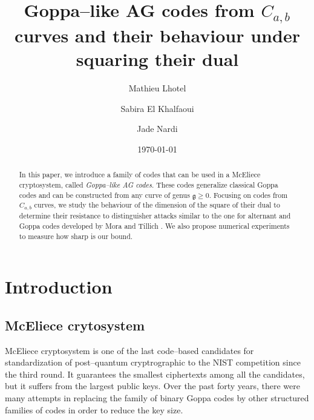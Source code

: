 \documentclass[a4paper]{amsart}
\title{Goppa--like AG codes from $C_{a,b}$ curves and their behaviour under squaring their dual}
\author{Mathieu Lhotel}
\author{Sabira El Khalfaoui}
\author{Jade Nardi}
\date{\today}
\theoremstyle{definition}
\theoremstyle{remark}
\begin{document}
\maketitle

\begin{abstract}
In this paper, we introduce a family of codes that can be used in a McEliece cryptosystem, called \emph{Goppa--like AG codes}. These codes generalize classical Goppa codes and can be constructed from any curve of genus $\mathfrak{g} \geq 0$. Focusing on codes from $C_{a,b}$ curves, we study the behaviour of the dimension of the square of their dual to determine their resistance to distinguisher attacks similar to the one for alternant and Goppa codes developed by Mora and Tillich \cite{MT21}. We also propose numerical experiments to measure how sharp is our bound.
\end{abstract}
 

\section*{Introduction}

\subsection*{McEliece crytosystem}
McEliece cryptosystem is one of the last code--based candidates for standardization of post--quantum cryptrographic to the NIST competition since the third round. It guarantees the smallest ciphertexts among all the candidates, but it suffers from the largest public keys. Over the past forty years, there were many attempts in replacing the family of binary Goppa codes by other structured families of codes in order to reduce the key size.
\end{document}
